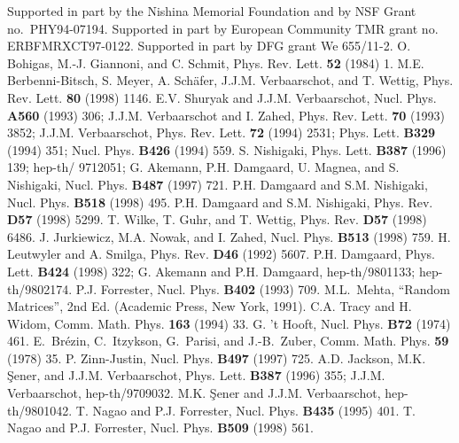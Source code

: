 \begin{references}
 Supported in part by the Nishina Memorial Foundation
and by NSF Grant no.\ PHY94-07194.
 Supported in part by European Community TMR grant
no. ERBFMRXCT97-0122.
 Supported in part by DFG grant We 655/11-2.
 O. Bohigas, M.-J. Giannoni, and C. Schmit,
Phys. Rev. Lett. {\bf 52} (1984) 1.
M.E. Berbenni-Bitsch, S. Meyer, A. Sch\"{a}fer,
J.J.M. Verbaarschot, and T. Wettig, Phys. Rev. Lett. {\bf 80} (1998)
1146. 
E.V. Shuryak and J.J.M. Verbaarschot, Nucl. Phys. {\bf A560}
(1993) 306;
J.J.M. Verbaarschot and I. Zahed, \linebreak[3]
Phys. Rev. Lett. {\bf 70} 
(1993) 3852;
J.J.M. Verbaarschot, Phys. Rev. Lett. {\bf 72} (1994) 2531;
Phys. Lett. {\bf B329} (1994) 351; Nucl. Phys. {\bf B426} (1994) 559.
S. Nishigaki,
Phys. Lett. {\bf B387} (1996) 139;
hep-th/ 9712051;
G. Akemann, P.H. Damgaard, U. Magnea, and S. Nishigaki,
Nucl. Phys. {\bf B487} (1997) 721.
P.H. Damgaard and S.M. Nishigaki,
Nucl. Phys. {\bf B518} (1998) 495.
P.H. Damgaard and S.M. Nishigaki,
Phys. Rev. {\bf D57} (1998) 5299.
T. Wilke, T. Guhr, and T. Wettig,
Phys. Rev. {\bf D57} (1998) 6486.
J. Jurkiewicz, M.A. Nowak, and I. Zahed, 
Nucl. Phys. {\bf B513} (1998) 759.
 H. Leutwyler and A. Smilga, Phys. Rev. {\bf D46} (1992) 5607.
P.H. Damgaard, Phys. Lett. {\bf B424} (1998) 322; 
G. Akemann and P.H. Damgaard, hep-th/9801133; hep-th/9802174.
P.J. Forrester,
Nucl. Phys. {\bf B402} (1993) 709.
M.L.~Mehta, 
``Random Matrices'', 2nd Ed. (Academic Press, New York, 1991).
C.A. Tracy and H. Widom,
Comm. Math. Phys. {\bf 163} (1994) 33.
 G. 't Hooft, Nucl. Phys. {\bf B72} (1974) 461.
E.~Br\'ezin, C.~Itzykson, G.~Parisi, and J.-B.~Zuber,
Comm. Math. Phys. {\bf 59} (1978) 35.
P. Zinn-Justin, 
Nucl. Phys. {\bf B497} (1997) 725.
A.D. Jackson, M.K. \c{S}ener, and J.J.M. Verbaarschot,
Phys. Lett. {\bf B387} (1996) 355;
J.J.M. Verbaarschot, hep-th/9709032.
M.K. \c{S}ener and J.J.M. Verbaarschot, hep-th/9801042.
T. Nagao and P.J. Forrester,
Nucl. Phys. {\bf B435} (1995) 401.
T. Nagao and P.J. Forrester,
Nucl. Phys. {\bf B509} (1998) 561.
\end{references}
\widetext


